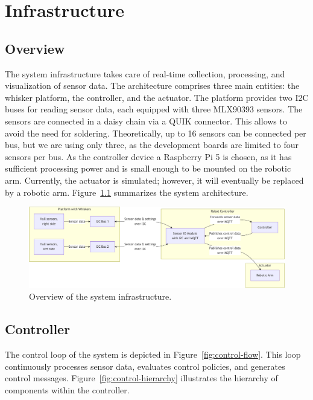 

\chapter{Infrastructure}


\section{Overview}
The system infrastructure takes care of real-time collection, processing, and visualization of sensor data.
The architecture comprises three main entities: the whisker platform, the controller, and the actuator.
The platform provides two I2C buses for reading sensor data, each equipped with three MLX90393 sensors.
The sensors are connected in a daisy chain via a QUIK connector.
This allows to avoid the need for soldering.
Theoretically, up to 16 sensors can be connected per bus, but we are using only three, as the development boards are limited to four sensors per bus.
As the controller device a Raspberry Pi 5 is chosen, as it has sufficient processing power and is small enough to be mounted on the robotic arm.
Currently, the actuator is simulated; however, it will eventually be replaced by a robotic arm.
Figure~\ref{fig:infrastructure_overview} summarizes the system architecture.

\begin{figure}[htb]
    \centering
    \includegraphics[width=\textwidth]{figures/diagrams/infrastructure-overview}
    \caption{Overview of the system infrastructure.}
    \label{fig:infrastructure_overview}
\end{figure}


\section{Controller}
The control loop of the system is depicted in Figure~\ref{fig:control-flow}.
This loop continuously processes sensor data, evaluates control policies, and generates control messages.
Figure~\ref{fig:control-hierarchy} illustrates the hierarchy of components within the controller.


